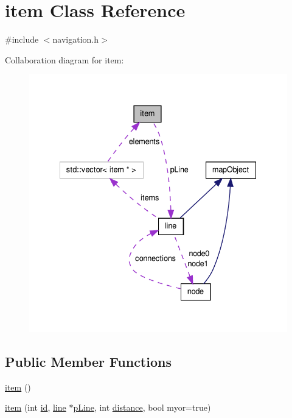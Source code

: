 \hypertarget{classitem}{\section{item \-Class \-Reference}
\label{classitem}
}


{\ttfamily \#include $<$navigation.\-h$>$}



\-Collaboration diagram for item\-:\nopagebreak
\begin{figure}[H]
\begin{center}
\leavevmode
\includegraphics[width=331pt]{classitem__coll__graph}
\end{center}
\end{figure}
\subsection*{\-Public \-Member \-Functions}
\begin{DoxyCompactItemize}
\item 
\hyperlink{classitem_a344fbf6e3db0d59e0c8ac75cd42ee144}{item} ()
\item 
\hyperlink{classitem_a1842bb0f69fce22811a0006498deefdd}{item} (int \hyperlink{classitem_ad073d1c2b50db649b29c7b87d04c4c4c}{id}, \hyperlink{classline}{line} $\ast$\hyperlink{classitem_a1b763ddd70a3ce06fddbfec4733520b8}{p\-Line}, int \hyperlink{classitem_a1f807e814f5e0068ff09532c5cfd9f1a}{distance}, bool myor=true)
\end{DoxyCompactItemize}
